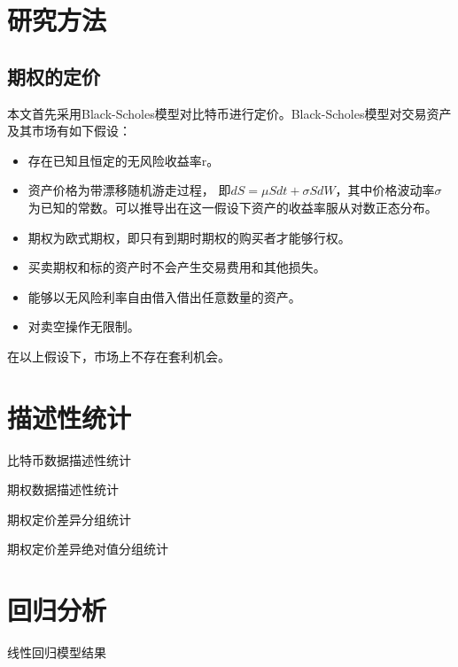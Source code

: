 \documentclass[degree=bachelor]{thuthesis}
\begin{document}
\chapter{研究方法}
    \section{期权的定价}
    本文首先采用Black-Scholes模型\cite{10.2307/1831029}对比特币进行定价。Black-Scholes模型对交易资产及其市场有如下假设：
    \begin{itemize}
        \item 存在已知且恒定的无风险收益率r。
        \item 资产价格为带漂移随机游走过程， 即$dS={\mu}Sdt+{\sigma}SdW$，其中价格波动率$\sigma$为已知的常数。可以推导出在这一假设下资产的收益率服从对数正态分布。
        \item 期权为欧式期权，即只有到期时期权的购买者才能够行权。
        \item 买卖期权和标的资产时不会产生交易费用和其他损失。
        \item 能够以无风险利率自由借入借出任意数量的资产。
        \item 对卖空操作无限制。
    \end{itemize}
    在以上假设下，市场上不存在套利机会。

\chapter{描述性统计}

\begin{table}[!ht]
    \centering
    \caption{比特币数据描述性统计}
    
\end{table}

\begin{table}[!ht]
    \centering
    \caption{期权数据描述性统计}

\end{table}

\begin{table}[!ht]
    \centering
    \caption{期权定价差异分组统计}
    
\end{table}

\begin{table}[!ht]
    \centering
    \caption{期权定价差异绝对值分组统计}
    
\end{table}

\chapter{回归分析}

\begin{table}[!ht]
    \centering
    \caption{线性回归模型结果}
    
\end{table}



\end{document}
